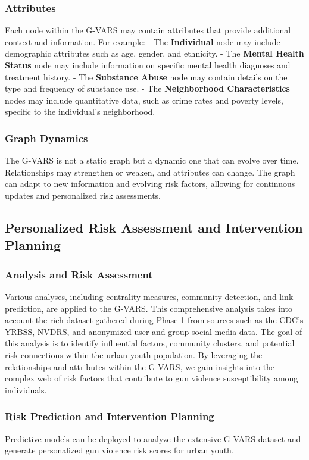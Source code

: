 \documentclass[11pt]{article}
\begin{document}
\subsubsection*{Attributes}

Each node within the \textsf{G-VARS} may contain attributes that provide additional context and information. For example:
- The \textbf{Individual} node may include demographic attributes such as age, gender, and ethnicity.
- The \textbf{Mental Health Status} node may include information on specific mental health diagnoses and treatment history.
- The \textbf{Substance Abuse} node may contain details on the type and frequency of substance use.
- The \textbf{Neighborhood Characteristics} nodes may include quantitative data, such as crime rates and poverty levels, specific to the individual's neighborhood.

\subsubsection*{Graph Dynamics} The \textsf{G-VARS} is not a static graph but a dynamic one that can evolve over time. Relationships may strengthen or weaken, and attributes can change. The graph can adapt to new information and evolving risk factors, allowing for continuous updates and personalized risk assessments.


\subsection{Personalized Risk Assessment and Intervention Planning}

\subsubsection*{Analysis and Risk Assessment} Various analyses, including centrality measures, community detection, and link prediction, are applied to the \textsf{G-VARS}. This comprehensive analysis takes into account the rich dataset gathered during Phase 1 from sources such as the CDC's YRBSS, NVDRS, and anonymized user and group social media data. The goal of this analysis is to identify influential factors, community clusters, and potential risk connections within the urban youth population. By leveraging the relationships and attributes within the \textsf{G-VARS}, we gain insights into the complex web of risk factors that contribute to gun violence susceptibility among individuals.


\subsubsection*{Risk Prediction and Intervention Planning} Predictive models can be deployed to analyze the extensive \textsf{G-VARS} dataset and generate personalized gun violence risk scores for urban youth. 
\end{document}
